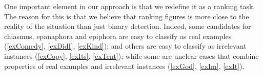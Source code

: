
One important element in our approach is that we redefine it as a ranking task.
The reason for this is that we believe that ranking figures is more close to the reality of the situation than just binary detection.  Indeed, some candidates for chiasmus, epanaphora and epiphora are easy to classify as real examples (\ref{exComedy}, \ref{exDidI}, \ref{exKind}); and others are easy to classify as irrelevant instances (\ref{exCopy}, \ref{exIts}, \ref{exTent}); while some are unclear cases that combine properties of real examples and irrelevant instances (\ref{exGod}, \ref{exIm}, \ref{exIt}).
\vspace{0.2cm}
